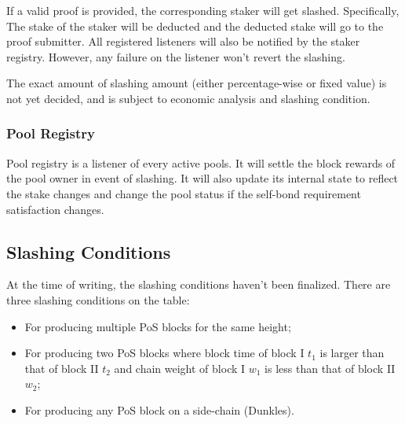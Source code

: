 If a valid proof is provided, the corresponding staker will get slashed. Specifically, The stake of the staker will be deducted and the deducted stake will go to the proof submitter. All registered listeners will also be notified by the staker registry. However, any failure on the listener won't revert the slashing.

The exact amount of slashing amount (either percentage-wise or fixed value) is not yet decided, and is subject to economic analysis and slashing condition.

\subsubsection{Pool Registry}

Pool registry is a listener of every active pools. It will settle the block rewards of the pool owner in event of slashing. It will also update its internal state to reflect the stake changes and change the pool status if the self-bond requirement satisfaction changes.

\subsection{Slashing Conditions}

At the time of writing, the slashing conditions haven't been finalized. There are three slashing conditions on the table:
\begin{itemize}
    \item For producing multiple PoS blocks for the same height;
    \item For producing two PoS blocks where block time of block I $t_1$ is larger than that of block II $t_2$ and chain weight of block I $w_1$ is less than that of block II $w_2$;
    \item For producing any PoS block on a side-chain (Dunkles).
\end{itemize}